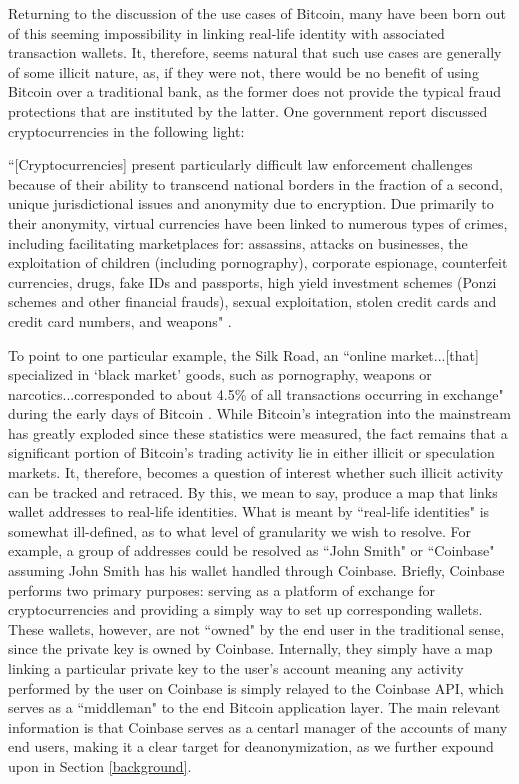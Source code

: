 \documentclass{article}
\begin{document}
Returning to the discussion of the use cases of Bitcoin, many have been born out of this seeming impossibility in linking real-life identity with associated transaction wallets. It, therefore, seems natural that such use cases are generally of some illicit nature, as, if they were not, there would be no benefit of using Bitcoin over a traditional bank, as the former does not provide the typical fraud protections that are instituted by the latter. One government report discussed cryptocurrencies in the following light:

``[Cryptocurrencies] present particularly difficult law enforcement challenges because of their ability to transcend national borders in the fraction of a second, unique jurisdictional issues and anonymity due to encryption. Due primarily to their anonymity, virtual currencies have been linked to numerous types of crimes, including facilitating marketplaces for: assassins, attacks on businesses, the exploitation of children (including pornography), corporate espionage, counterfeit currencies, drugs, fake IDs and passports, high yield investment schemes (Ponzi schemes and other financial frauds), sexual exploitation, stolen credit cards and credit card numbers, and weapons" \cite{virtual-currency}. 

To point to one particular example, the Silk Road, an ``online market...[that] specialized in `black market' goods, such as pornography, weapons or narcotics...corresponded to about 4.5\% of all transactions occurring in exchange" during the early days of Bitcoin \cite{silk}. While Bitcoin's integration into the mainstream has greatly exploded since these statistics were measured, the fact remains that a significant portion of Bitcoin's trading activity lie in either illicit or speculation markets. It, therefore, becomes a question of interest whether such illicit activity can be tracked and retraced. By this, we mean to say, produce a map that links wallet addresses to real-life identities. What is meant by ``real-life identities" is somewhat ill-defined, as to what level of granularity we wish to resolve. For example, a group of addresses could be resolved as ``John Smith" or ``Coinbase" assuming John Smith has his wallet handled through Coinbase. Briefly, Coinbase performs two primary purposes: serving as a platform of exchange for cryptocurrencies and providing a simply way to set up corresponding wallets. These wallets, however, are not ``owned" by the end user in the traditional sense, since the private key is owned by Coinbase. Internally, they simply have a map linking a particular private key to the user's account meaning any activity performed by the user on Coinbase is simply relayed to the Coinbase API, which serves as a ``middleman" to the end Bitcoin application layer. The main relevant information is that Coinbase serves as a centarl manager of the accounts of many end users, making it a clear target for deanonymization, as we further expound upon in Section \ref{background}.
\end{document}
